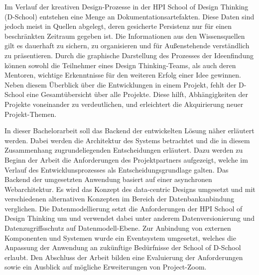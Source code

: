
Im Verlauf der kreativen Design-Prozesse in der HPI School of Design Thinking (D-School) entstehen eine Menge an Dokumentationsartefakten. Diese Daten sind jedoch meist in Quellen abgelegt, deren gesicherte Persistenz nur für einen beschränkten Zeitraum gegeben ist. Die Informationen aus den Wissensquellen gilt es dauerhaft zu sichern, zu organisieren und für Außenstehende verständlich zu präsentieren. Durch die graphische Darstellung des Prozesses der Ideenfindung können sowohl die Teilnehmer eines Design Thinking-Teams, als auch deren Mentoren, wichtige Erkenntnisse für den weiteren Erfolg einer Idee gewinnen. Neben diesem Überblick über die Entwicklungen in einem Projekt, fehlt der D-School eine Gesamtübersicht über alle Projekte. Diese hilft, Abhängigkeiten der Projekte voneinander zu verdeutlichen, und erleichtert die Akquirierung neuer Projekt-Themen. 

In dieser Bachelorarbeit soll das Backend der entwickelten Lösung  näher erläutert werden. Dabei werden die Architektur des Systems betrachtet und die in diesem Zusammenhang zugrundeliegenden Entscheidungen erläutert. Dazu werden zu Beginn der Arbeit die Anforderungen des Projektpartners aufgezeigt, welche im Verlauf des Entwicklunsprozesses als Entscheidungsgrundlage galten. Das Backend der umgesetzten Anwendung basiert auf einer asynchronen Webarchitektur. Es wird das Konzept des data-centric Designs umgesetzt und mit verschiedenen alternativen Konzepten im Bereich der Datenbankanbindung verglichen. Die Datenmodellierung setzt die Anforderungen der HPI School of Design Thinking um und verwendet dabei unter anderem Datenversionierung und Datenzugriffsschutz auf Datenmodell-Ebene. Zur Anbindung von externen Komponenten und Systemen wurde ein Eventsystem umgesetzt, welches die Anpassung der Anwendung an zukünftige Bedürfnisse der School of D-School erlaubt. Den Abschluss der Arbeit bilden eine Evaluierung der Anforderungen sowie ein Ausblick auf mögliche Erweiterungen von Project-Zoom.
